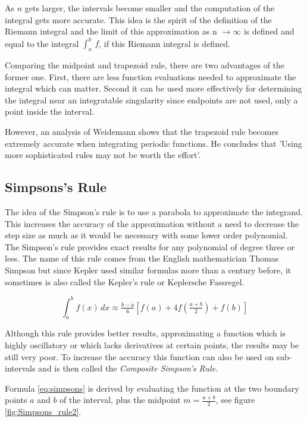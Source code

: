 As $n$ gets larger, the intervals become smaller and the computation of the integral gets more accurate. This idea is the spirit of the definition of the Riemann integral and the limit of this approximation as n $\to \infty$ is defined and equal to the integral $\int_{a}^{b}\, f$, if this Riemann integral is defined. \cite{Wiki_Rectangle}

Comparing the midpoint and trapezoid rule, there are two advantages of the former one. First, there are less function evaluations needed to approximate the integral which can matter. Second it can be used more effectively for determining the integral near an integratable singularity since endpoints are not used, only a point inside the interval. \cite{Dalziel1998}

However, an analysis of Weidemann \cite{Weideman2002} shows that the trapezoid rule becomes extremely accurate when integrating periodic functions. He concludes that 'Using more sophisticated rules may not be worth the effort'.



\subsection{Simpsons's Rule}

The idea of the Simpson's rule is to use a parabola to approximate the integrand. This increases the accuracy of the approximation without a need to decrease the step size as much as it would be necessary with some lower order polynomial. The Simpson's rule provides exact results for any polynomial of degree three or less. The name of this rule comes from the English mathematician Thomas Simpson but since Kepler used similar formulas more than a century before, it sometimes is also called the Kepler's rule or Keplersche Fassregel. \cite{Wiki_Simpsons}

\begin{equation}
 \int_{a}^{b} f(x) \, dx \approx \tfrac{b-a}{6}\left[f(a) + 4f\left(\tfrac{a+b}{2}\right)+f(b)\right]
\label{eq:simpsons}
\end{equation}

Although this rule provides better results, approximating a function which is highly oscillatory or which lacks derivatives at certain points, the results may be still very poor. To increase the accuracy this function can also be used on sub-intervals and is then called the \emph{Composite Simpson's Rule}.

Formula \ref{eq:simpsons} is derived by evaluating the function at the two boundary points $a$ and $b$ of the interval, plus the midpoint $m = \frac{a+b}{2}$, see figure \ref{fig:Simpsons_rule2}. 

